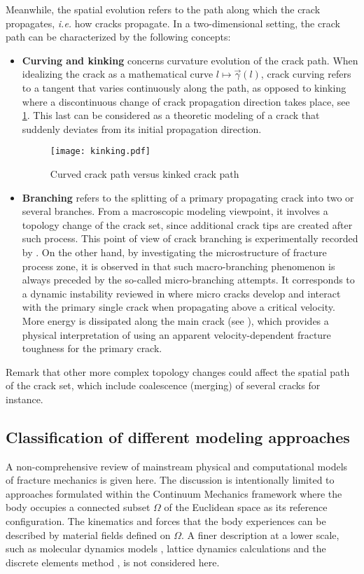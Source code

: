 Meanwhile, the spatial evolution refers to the path along which the crack propagates, \emph{i.e.} how cracks propagate. In a two-dimensional setting, the crack path can be characterized by the following concepts:
\begin{itemize}
\item \textbf{Curving and kinking} concerns curvature evolution of the crack path. When idealizing the crack as a mathematical curve $l\mapsto\vec{\gamma}(l)$, crack curving refers to a tangent that varies continuously along the path, as opposed to kinking where a discontinuous change of crack propagation direction takes place, see \cref{fig:kink}. This last can be considered as a theoretic modeling of a crack that suddenly deviates from its initial propagation direction.
\begin{figure}[htbp]
\centering
\texttt{[image: kinking.pdf]}
\caption{Curved crack path versus kinked crack path} \label{fig:kink}
\end{figure}

\item \textbf{Branching} refers to the splitting of a primary propagating crack into two or several branches. From a macroscopic modeling viewpoint, it involves a topology change of the crack set, since additional crack tips are created after such process. This point of view of crack branching is experimentally recorded by \cite{Schardin:2012}. On the other hand, by investigating the microstructure of fracture process zone, it is observed in \cite{Ravi-ChandarKnauss:1984,Ravi-ChandarKnauss:1984a,SharonGrossFineberg:1995,SharonFineberg:1996} that such macro-branching phenomenon is always preceded by the so-called micro-branching attempts. It corresponds to a dynamic instability reviewed in \cite{FinebergMarder:1999} where micro cracks develop and interact with the primary single crack when propagating above a critical velocity. More energy is dissipated along the main crack (see \cite{SharonGrossFineberg:1996}), which provides a physical interpretation of using an apparent velocity-dependent fracture toughness for the primary crack.
\end{itemize}
Remark that other more complex topology changes could affect the spatial path of the crack set, which include coalescence (merging) of several cracks for instance.

\subsection{Classification of different modeling approaches} \label{sec:discretemodels}
A non-comprehensive review of mainstream physical and computational models of fracture mechanics is given here. The discussion is intentionally limited to approaches formulated within the Continuum Mechanics framework where the body occupies a connected subset $\Omega$ of the Euclidean space as its reference configuration. The kinematics and forces that the body experiences can be described by material fields defined on $\Omega$. A finer description at a lower scale, such as molecular dynamics models \cite{AbrahamBrodbeckRafeyRudge:1994}, lattice dynamics calculations \cite{MarderGross:1995} and the discrete elements method \cite{HentzDonzeDaudeville:2004}, is not considered here.

